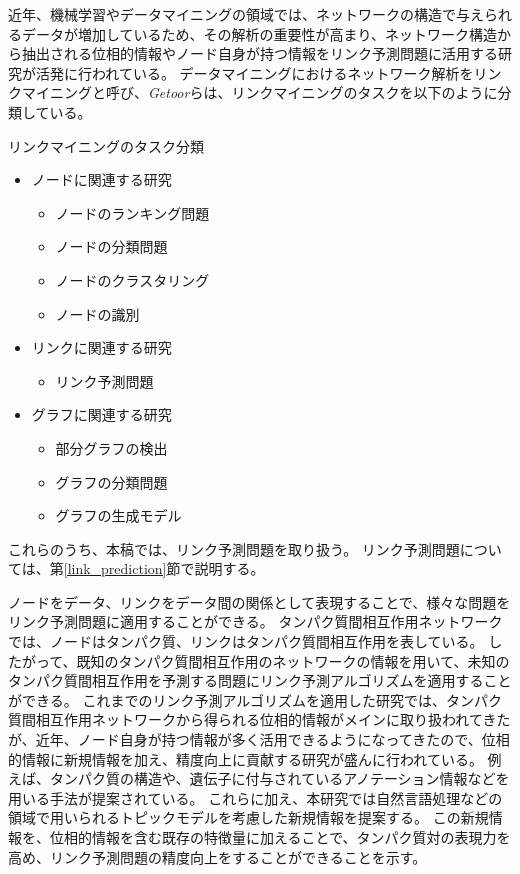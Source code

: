 \documentclass[titlepage,12pt]{jreport}
\begin{document}
近年、機械学習やデータマイニングの領域では、ネットワークの構造で与えられるデータが増加しているため、その解析の重要性が高まり、ネットワーク構造から抽出される位相的情報やノード自身が持つ情報をリンク予測問題に活用する研究が活発に行われている。 データマイニングにおけるネットワーク解析をリンクマイニングと呼び、{\it Getoor}らは、リンクマイニングのタスクを以下のように分類している\cite{getoor05}。
\begin{itembox}[1]{リンクマイニングのタスク分類}
\begin{itemize}
	\item ノードに関連する研究
		\begin{itemize}
			\item ノードのランキング問題
			\item ノードの分類問題
			\item ノードのクラスタリング
			\item ノードの識別
		\end{itemize}
	\item リンクに関連する研究
		\begin{itemize}
			\item リンク予測問題
		\end{itemize}
	\item グラフに関連する研究
		\begin{itemize}
			\item 部分グラフの検出
			\item グラフの分類問題
			\item グラフの生成モデル
		\end{itemize}
\end{itemize}
\end{itembox}
これらのうち、本稿では、リンク予測問題を取り扱う。 リンク予測問題については、第\ref{link_prediction}節で説明する。

ノードをデータ、リンクをデータ間の関係として表現することで、様々な問題をリンク予測問題に適用することができる。 タンパク質間相互作用ネットワークでは、ノードはタンパク質、リンクはタンパク質間相互作用を表している。 したがって、既知のタンパク質間相互作用のネットワークの情報を用いて、未知のタンパク質間相互作用を予測する問題にリンク予測アルゴリズムを適用することができる。 これまでのリンク予測アルゴリズムを適用した研究では、タンパク質間相互作用ネットワークから得られる位相的情報がメインに取り扱われてきたが、近年、ノード自身が持つ情報が多く活用できるようになってきたので、位相的情報に新規情報を加え、精度向上に貢献する研究が盛んに行われている。%
例えば、タンパク質の構造や、遺伝子に付与されているアノテーション情報などを用いる手法が提案されている。 これらに加え、本研究では自然言語処理などの領域で用いられるトピックモデルを考慮した新規情報を提案する。 この新規情報を、位相的情報を含む既存の特徴量に加えることで、タンパク質対の表現力を高め、リンク予測問題の精度向上をすることができることを示す。
\end{document}
